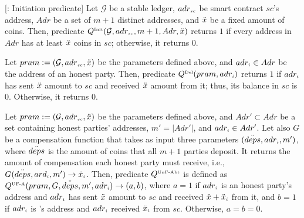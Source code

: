  
 
 \begin{definition}
  [\qinit: Initiation predicate] Let $\mathcal{G}$ be a stable ledger, $adr_{\scriptscriptstyle sc}$ be smart contract $sc$'s address, $Adr$ be a set of $m+1$ distinct addresses, and $\ddot{x}$ be a fixed amount of coins. Then, predicate $Q^{\scriptscriptstyle \text{Init}}(\mathcal{G}, adr_{\scriptscriptstyle sc}, m+1, Adr, \ddot{x})$ returns $1$ if every address in $Adr$ has at least $\ddot{x}$ coins in $sc$; otherwise, it returns $0$. 
 \end{definition}

 
 
    \begin{definition}   Let $pram:=(\mathcal{G}, adr_{\scriptscriptstyle sc}, \ddot{x})$ be the parameters defined above, and   $adr_{\scriptscriptstyle i}\in Adr$ be the address of an honest party. 
    Then, predicate $Q^{\scriptscriptstyle \text{Del}}(pram, adr_{\scriptscriptstyle i})$ returns $1$ if $adr_{\scriptscriptstyle i}$ has sent $\ddot{x}$ amount to $sc$ and received  $\ddot{x}$ amount from it; thus,  its balance in $sc$ is $0$. Otherwise, it returns $0$. 
  \end{definition}
 
 
 
   \begin{definition}  
 Let $pram:=(\mathcal{G}, adr_{\scriptscriptstyle sc}, \ddot{x})$ be the parameters defined above, and $Adr'\subset Adr$ be a set containing honest parties' addresses, $m' = |Adr'|$,  and   $adr_{\scriptscriptstyle i}\in Adr'$. Let also $G$ be a compensation function that takes as input  three parameters $(\ddot{deps}, adr_{\scriptscriptstyle i}, m')$, where $\ddot{deps}$ is the amount of coins  that all $m+1$ parties  deposit. It returns the amount of compensation each honest party must receive, i.e., $G(\ddot{deps}, ard_{\scriptscriptstyle i}, m')\rightarrow \ddot{x}_{\scriptscriptstyle i}$. Then, predicate $Q^{\scriptscriptstyle \text{UnF-Abt}}$ is defined as $Q^{\scriptscriptstyle \text{UF-A}}(pram, G, \ddot{deps}, m', adr_{\scriptscriptstyle i})\rightarrow (a,b)$, where $a=1$ if $adr_{\scriptscriptstyle i}$ is an honest party's address and $adr_{\scriptscriptstyle i}$ has sent $\ddot{x}$ amount to $sc$ and received  $\ddot{x}+\ddot{x}_{\scriptscriptstyle i}$  from it, and $b=1$ if $adr_{\scriptscriptstyle i}$ is \aud's address and $adr_{\scriptscriptstyle i}$ received $\ddot{x}_{\scriptscriptstyle i}$  from $sc$. Otherwise, $a=b=0$. 
  \end{definition}
  
